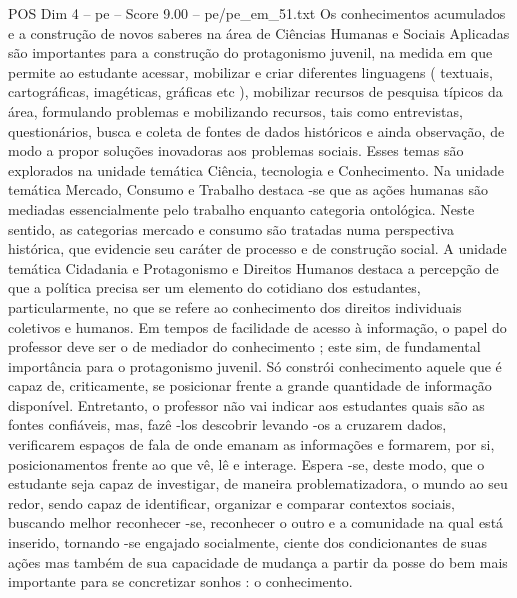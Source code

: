 \begin{textsample}{POS Dim 4 – pe – Score 9.00 – pe/pe\_em\_51.txt}
Os conhecimentos acumulados e a construção de novos saberes na área de Ciências Humanas e Sociais Aplicadas são importantes para a construção do protagonismo juvenil, na medida em que permite ao estudante acessar, mobilizar e criar diferentes linguagens ( textuais, cartográficas, imagéticas, gráficas etc ), mobilizar recursos de pesquisa típicos da área, formulando problemas e mobilizando recursos, tais como entrevistas, questionários, busca e coleta de fontes de dados históricos e ainda observação, de modo a propor soluções inovadoras aos problemas sociais.
Esses temas são explorados na unidade temática Ciência, tecnologia e Conhecimento.
Na unidade temática Mercado, Consumo e Trabalho destaca -se que as ações humanas são mediadas essencialmente pelo trabalho enquanto categoria ontológica.
Neste sentido, as categorias mercado e consumo são tratadas numa perspectiva histórica, que evidencie seu caráter de processo e de construção social.
A unidade temática Cidadania e Protagonismo e Direitos Humanos destaca a percepção de que a política precisa ser um elemento do cotidiano dos estudantes, particularmente, no que se refere ao conhecimento dos direitos individuais coletivos e humanos.
Em tempos de facilidade de acesso à informação, o papel do professor deve ser o de mediador do conhecimento ; este sim, de fundamental importância para o protagonismo juvenil.
Só constrói conhecimento aquele que é capaz de, criticamente, se posicionar frente a grande quantidade de informação disponível.
Entretanto, o professor não vai indicar aos estudantes quais são as fontes confiáveis, mas, fazê -los descobrir levando -os a cruzarem dados, verificarem espaços de fala de onde emanam as informações e formarem, por si, posicionamentos frente ao que vê, lê e interage.
Espera -se, deste modo, que o estudante seja capaz de investigar, de maneira problematizadora, o mundo ao seu redor, sendo capaz de identificar, organizar e comparar contextos sociais, buscando melhor reconhecer -se, reconhecer o outro e a comunidade na qual está inserido, tornando -se engajado socialmente, ciente dos condicionantes de suas ações mas também de sua capacidade de mudança a partir da posse do bem mais importante para se concretizar sonhos : o conhecimento.

\end{textsample}
